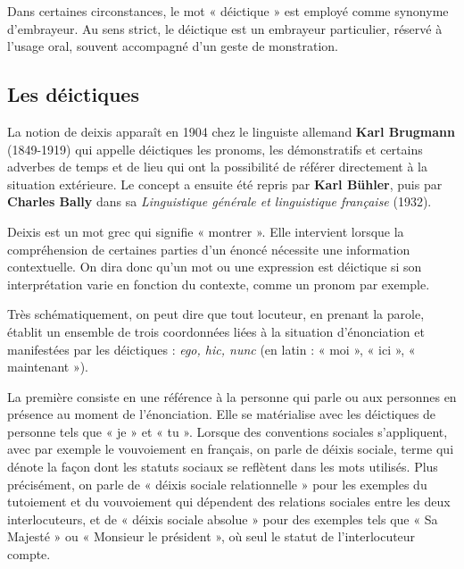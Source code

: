 Dans certaines circonstances, le mot « déictique » est employé comme synonyme d’embrayeur. Au sens strict, le déictique est un embrayeur particulier, réservé à l’usage oral, souvent accompagné d’un geste de monstration.

\subsection{Les déictiques}
La notion de deixis apparaît en 1904 chez le linguiste allemand \textbf{Karl Brugmann} (1849-1919) qui appelle déictiques les pronoms, les démonstratifs et certains adverbes de temps et de lieu qui ont la possibilité de référer directement à la situation extérieure. Le concept a ensuite été repris par \textbf{Karl Bühler}, puis par \textbf{Charles Bally} dans sa \textit{Linguistique générale et linguistique française} (1932).

Deixis est un mot grec qui signifie « montrer ». Elle intervient lorsque la compréhension de certaines parties d’un énoncé nécessite une information contextuelle. On dira donc qu’un mot ou une expression est déictique si son interprétation varie en fonction du contexte, comme un pronom par exemple.

Très schématiquement, on peut dire que tout locuteur, en prenant la parole, établit un ensemble de trois coordonnées liées à la situation d’énonciation et manifestées par les déictiques : \textit{ego, hic, nunc} (en latin : « moi », « ici », « maintenant »).

La première consiste en une référence à la personne qui parle ou aux personnes en présence au moment de l’énonciation. Elle se matérialise avec les déictiques de personne tels que « je » et « tu ». Lorsque des conventions sociales s’appliquent, avec par exemple le vouvoiement en français, on parle de déixis sociale, terme qui dénote la façon dont les statuts sociaux se reflètent dans les mots utilisés. Plus précisément, on parle de « déixis sociale relationnelle » pour les exemples du tutoiement et du vouvoiement qui dépendent des relations sociales entre les deux interlocuteurs, et de « déixis sociale absolue » pour des exemples tels que « Sa Majesté » ou « Monsieur le président », où seul le statut de l’interlocuteur compte.

